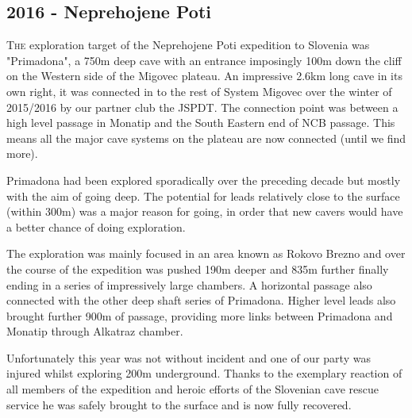 \newpage

\BgThispage

\begin{tcolorbox}
\chapter{2016 - Neprehojene Poti}
	\lettrine{T}{he} exploration target of the Neprehojene Poti expedition to Slovenia was "Primadona", a 750m deep cave with an entrance imposingly 100m down the cliff on the Western side of the Migovec plateau. An impressive 2.6km long cave in its own right, it was connected in to the rest of System Migovec over the winter of 2015/2016 by our partner club the JSPDT. The connection point was between a high level passage in Monatip and the South Eastern end of NCB passage. This means all the major cave systems on the plateau are now connected (until we find more).

	Primadona had been explored sporadically over the preceding decade but mostly with the aim of going deep. The potential for leads relatively close to the surface (within 300m) was a major reason for going, in order that new cavers would have a better chance of doing exploration.

	The exploration was mainly focused in an area known as Rokovo Brezno and over the course of the expedition was pushed 190m deeper and 835m further finally ending in a series of impressively large chambers.  A horizontal passage also connected with the other deep shaft series of Primadona. Higher level leads also brought further 900m of passage, providing more links between Primadona and Monatip through Alkatraz chamber.

	Unfortunately this year was not without incident and one of our party was injured whilst exploring 200m underground. Thanks to the exemplary reaction of all members of the expedition and heroic efforts of the Slovenian cave rescue service he was safely brought to the surface and is now fully recovered.
	\\
	\\
	\\
\end{tcolorbox}